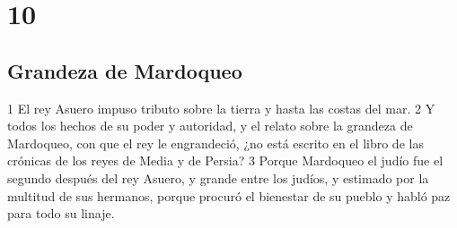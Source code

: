 \chapter{10}

\section*{Grandeza de Mardoqueo}


1 El rey Asuero impuso tributo sobre la tierra y hasta las costas del mar.
2 Y todos los hechos de su poder y autoridad, y el relato sobre la grandeza de Mardoqueo, con que el rey le engrandeció, ¿no está escrito en el libro de las crónicas de los reyes de Media y de Persia?
3 Porque Mardoqueo el judío fue el segundo después del rey Asuero, y grande entre los judíos, y estimado por la multitud de sus hermanos, porque procuró el bienestar de su pueblo y habló paz para todo su linaje.

